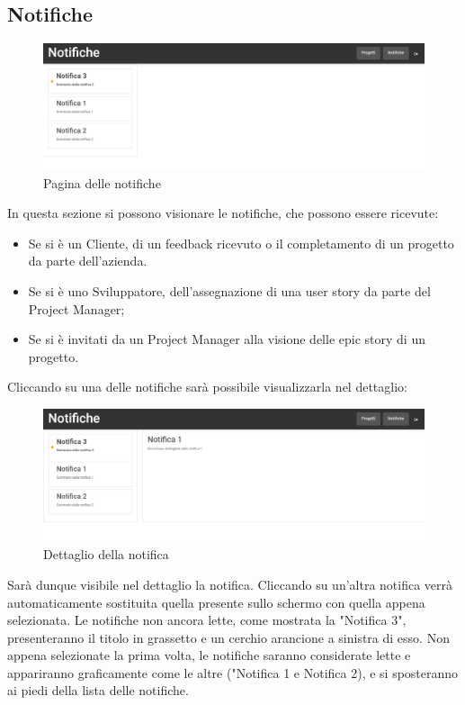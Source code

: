 \documentclass{article}
\begin{document}
\subsection{Notifiche}
 \begin{figure}[H]
      \centering
      \includegraphics[width=\textwidth]{documenti/Screenshot manuale utente/notifiche.png}
      \caption{Pagina delle notifiche}
      \label{notifiche}
    \end{figure} 
In questa sezione si possono visionare le notifiche, che possono essere ricevute:
\begin{itemize}
    \item Se si è un Cliente, di un feedback ricevuto o il completamento di un progetto da parte dell'azienda.
    \item Se si è uno Sviluppatore, dell'assegnazione di una user story da parte del Project Manager;
    \item Se si è invitati da un Project Manager alla visione delle epic story di un progetto.
\end{itemize}
Cliccando su una delle notifiche sarà possibile visualizzarla nel dettaglio:
\begin{figure}[H]
      \centering
      \includegraphics[width=\textwidth]{documenti/Screenshot manuale utente/dett not.png}
      \caption{Dettaglio della notifica}
      \label{notificadett}
    \end{figure} 
Sarà dunque visibile nel dettaglio la notifica. Cliccando su un'altra notifica verrà automaticamente sostituita quella presente sullo schermo con quella appena selezionata. Le notifiche non ancora lette, come mostrata la "Notifica 3", presenteranno il titolo in grassetto e un cerchio arancione a sinistra di esso. Non appena selezionate la prima volta, le notifiche saranno considerate lette e appariranno graficamente come le altre ("Notifica 1 e Notifica 2), e si sposteranno ai piedi della lista delle notifiche.\\
\end{document}
